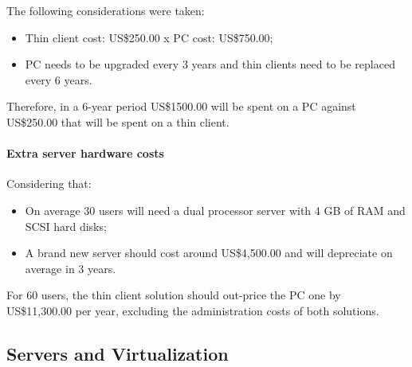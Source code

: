                 The following considerations were taken:
                \begin{itemize}
                    \item Thin client cost: US\$250.00 x PC cost: US\$750.00;
                    \item PC needs to be upgraded every 3 years and thin clients need to be replaced every 6 years.
                \end{itemize}
                Therefore, in a 6-year period US\$1500.00 will be spent on a PC against US\$250.00 that will be spent on a thin client.

            \paragraph*{Extra server hardware costs}
                Considering that:
                \begin{itemize}
                    \item On average 30 users will need a dual processor server with 4 GB of RAM and SCSI hard disks;
                    \item A brand new server should cost around US\$4,500.00 and will depreciate on average in 3 years.
                \end{itemize}
                For 60 users, the thin client solution should out-price the PC one by US\$11,300.00 per year, excluding the administration costs of both solutions.

        \subsection{Servers and Virtualization} \label{sec2:servers_virtualization}
                        
